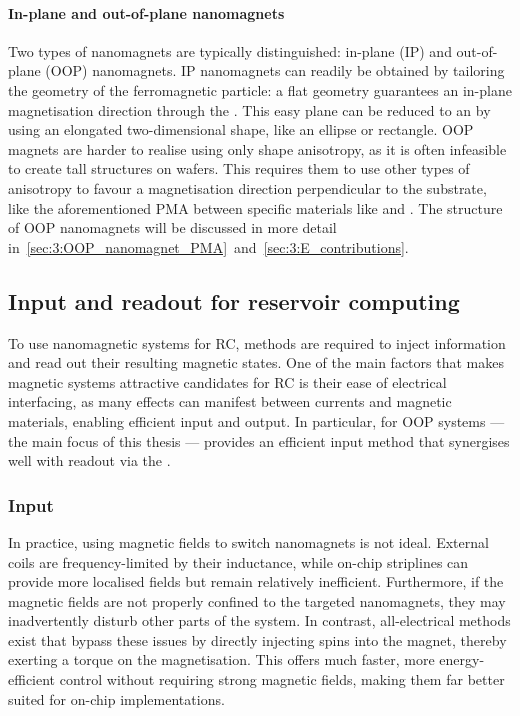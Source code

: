 \paragraph{In-plane and out-of-plane nanomagnets} %
Two types of nanomagnets are typically distinguished: in-plane (IP) and out-of-plane (OOP) nanomagnets.
IP nanomagnets can readily be obtained by tailoring the geometry of the ferromagnetic particle: a flat geometry guarantees an in-plane magnetisation direction through the .
This easy plane can be reduced to an  by using an elongated two-dimensional shape, like an ellipse or rectangle.
OOP magnets are harder to realise using only shape anisotropy, as it is often infeasible to create tall structures on wafers.
This requires them to use other types of anisotropy to favour a magnetisation direction perpendicular to the substrate, like the aforementioned PMA between specific materials like  and .
The structure of OOP nanomagnets will be discussed in more detail in~\cref{sec:3:OOP_nanomagnet_PMA}~and~\ref{sec:3:E_contributions}.

\subsection{Input and readout for reservoir computing}\label{sec:1:ASI_IO}
To use nanomagnetic systems for RC, methods are required to inject information and read out their resulting magnetic states.
One of the main factors that makes magnetic systems attractive candidates for RC is their ease of electrical interfacing, as many effects can manifest between currents and magnetic materials, enabling efficient input and output.
In particular, for OOP systems --- the main focus of this thesis ---  provides an efficient input method that synergises well with readout via the .

\subsubsection{Input}
In practice, using magnetic fields to switch nanomagnets is not ideal.
External coils are frequency-limited by their inductance, while on-chip striplines can provide more localised fields but remain relatively inefficient.
Furthermore, if the magnetic fields are not properly confined to the targeted nanomagnets, they may inadvertently disturb other parts of the system.
In contrast, all-electrical methods exist that bypass these issues by directly injecting spins into the magnet, thereby exerting a torque on the magnetisation.
This offers much faster, more energy-efficient control without requiring strong magnetic fields, making them far better suited for on-chip implementations.

